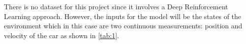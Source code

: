 There is no dataset for this project since it involves a Deep Reinforcement Learning approach. However, the inputs for the model will be the states of the environment which in this case are two continuous measurements: position and velocity of the car as shown in \ref{tab:1}.